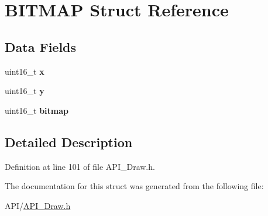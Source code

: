 \hypertarget{struct_b_i_t_m_a_p}{}\section{B\+I\+T\+M\+AP Struct Reference}
\label{struct_b_i_t_m_a_p}
\subsection*{Data Fields}
\begin{DoxyCompactItemize}
\item 
\mbox{\label{struct_b_i_t_m_a_p_a4dde988b1b2adba65ae3efa69f65d960}} 
uint16\+\_\+t {\bfseries x}
\item 
\mbox{\label{struct_b_i_t_m_a_p_ab0580f504a7428539be299fa71565f30}} 
uint16\+\_\+t {\bfseries y}
\item 
\mbox{\label{struct_b_i_t_m_a_p_a02b2be7b8ce086893453d390c5fdcf1d}} 
uint16\+\_\+t {\bfseries bitmap}
\end{DoxyCompactItemize}


\subsection{Detailed Description}


Definition at line 101 of file A\+P\+I\+\_\+\+Draw.\+h.



The documentation for this struct was generated from the following file\+:\begin{DoxyCompactItemize}
\item 
A\+P\+I/\hyperlink{_a_p_i___draw_8h}{A\+P\+I\+\_\+\+Draw.\+h}\end{DoxyCompactItemize}
